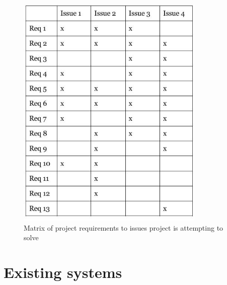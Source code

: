 \begin{figure}[h!]
  \centering
      \includegraphics[width=0.8\textwidth]{images/issues_to_req_matrix.jpg}
  \caption{Matrix of project requirements to issues project is attempting to solve}
\end{figure}

\section{Existing systems}
